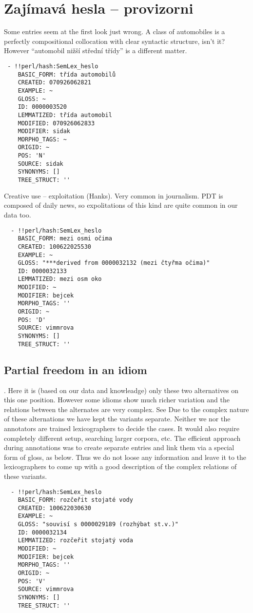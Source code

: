 \section{Zajímavá hesla -- provizorni}
Some entries seem at the first look just wrong. A class of automobiles is a perfectly compositional collocation with clear syntactic structure, isn't it? However ``automobil nižší střední třídy'' is a different matter.
\begin{verbatim}
 - !!perl/hash:SemLex_heslo 
    BASIC_FORM: třída automobilů
    CREATED: 070926062821
    EXAMPLE: ~
    GLOSS: ~
    ID: 0000003520
    LEMMATIZED: třída automobil
    MODIFIED: 070926062833
    MODIFIER: sidak
    MORPHO_TAGS: ~
    ORIGID: ~
    POS: 'N'
    SOURCE: sidak
    SYNONYMS: []
    TREE_STRUCT: ''
\end{verbatim}

Creative use -- exploitation (Hanks). Very common in journalism. PDT is composed of daily news, so expolitations of this kind are quite common in our data too.
\begin{verbatim}
  - !!perl/hash:SemLex_heslo 
    BASIC_FORM: mezi osmi očima
    CREATED: 100622025530
    EXAMPLE: ~
    GLOSS: "***derived from 0000032132 (mezi čtyřma očima)"
    ID: 0000032133
    LEMMATIZED: mezi osm oko
    MODIFIED: ~
    MODIFIER: bejcek
    MORPHO_TAGS: ''
    ORIGID: ~
    POS: 'D'
    SOURCE: vimmrova
    SYNONYMS: []
    TREE_STRUCT: ''
\end{verbatim}

\subsection{Partial freedom in an idiom}
. Here it is (based on our data and knowleadge) only these two alternatives on this one position. However some idioms show much richer variation and the relations between the alternates are very complex. See  Due to the complex nature of these alternations we have kept the variants separate. Neither we nor the annotators are trained lexicographers to decide the cases. It would also require completely different setup, searching larger corpora, etc. The efficient approach during annotations was to create separate entries and link them via a special form of gloss, as below.  Thus we do not loose any information and leave it to the lexicographers to come up with a good description of the complex relations of these variants.
\begin{verbatim}
  - !!perl/hash:SemLex_heslo 
    BASIC_FORM: rozčeřit stojaté vody
    CREATED: 100622030630
    EXAMPLE: ~
    GLOSS: "souvisí s 0000029189 (rozhýbat st.v.)"
    ID: 0000032134
    LEMMATIZED: rozčeřit stojatý voda
    MODIFIED: ~
    MODIFIER: bejcek
    MORPHO_TAGS: ''
    ORIGID: ~
    POS: 'V'
    SOURCE: vimmrova
    SYNONYMS: []
    TREE_STRUCT: ''
\end{verbatim}

